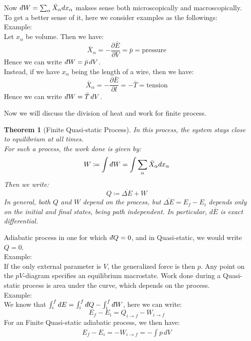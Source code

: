\documentclass[11pt]{article}
\theoremstyle{break}
\theoremstyle{break}
\newtheorem{thm}{Theorem}[section]
\newcommand{\dbar}{d\hspace*{-0.08em}\bar{}\hspace*{0.1em}}
\newcommand{\example}{\color{green}Example: \color{black}}
\begin{document}
Now $\dbar W = \sum_{\alpha} \bar{X}_{\alpha} dx_{\alpha}$ makses sense both microscopically and macroscopically. \\
To get a better sense of it, here we consider examples as the followings:\\

\example\\
Let $x_{\alpha}$ be volume. Then we have:
$$\bar{X}_{\alpha} = -\frac{\partial \bar{E}}{\partial V} = \bar{p} = \text{pressure}$$
Hence we can write $\dbar W = \bar{p}\, dV$. \\

Instead, if we have $x_{\alpha}$ being the length of a wire, then we have:
$$\bar{X}_{\alpha} = -\frac{\partial \bar{E}}{\partial l} = -\bar{T} = \text{tension}$$
Hence we can write $\dbar W = \bar{T}\, dV$.

\newpage
Now we will discuss the division of heat and work for finite process.\\

\begin{thm}[Finite Quasi-static Process]
In this process, the system stays close to equilibrium at all times.\\ For such a process, the work done is given by: 
$$W \coloneqq \int \dbar W = \int \sum_{\alpha} \bar{X}_{\alpha} dx_{\alpha}$$
Then we write:
$$Q \coloneqq \overline{\Delta E} + W$$
In general, both $Q$ and $W$ depend on the process, but $\overline{ \Delta E} = E_f - E_i$ depends only on the initial and final states, being path independent. In particular, $d\bar{E}$ is exact differential.
\end{thm}

Adiabatic process in one for which $\dbar Q = 0$, and in Quasi-static, we would write $Q= 0 $. \\

\example\\
If the only external parameter is $V$, the generalized force is then $p$. Any point on the $pV$-diagram specifies an equilibrium macrostate. Work done during a Quasi-static process is area under the curve, which depends on the process. \\

\example\\
We know that $\int_i^f dE = \int_i^f \dbar Q - \int_i^f \dbar W$, here we can write:
$$E_f - E_i = Q_{i\to f} - W_{i\to f}$$
For an Finite Quasi-static adiabatic process, we then have:
\begin{align*}
E_f - E_i = -W_{i \to f} = -\int p\, dV
\end{align*}
\end{document}
